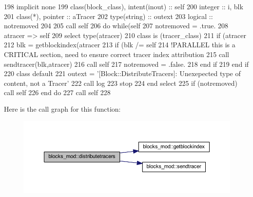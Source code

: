 \begin{DoxyCode}
198     \textcolor{keywordtype}{implicit none}
199     \textcolor{keywordtype}{class}(block\_class), \textcolor{keywordtype}{intent(inout)} :: self
200     \textcolor{keywordtype}{integer} :: i, blk
201     \textcolor{keywordtype}{class}(*), \textcolor{keywordtype}{pointer} :: aTracer
202     \textcolor{keywordtype}{type}(string) :: outext
203     \textcolor{keywordtype}{logical} :: notremoved
204 
205     \textcolor{keyword}{call }self%
206     \textcolor{keywordflow}{do} \textcolor{keywordflow}{while}(self%
207         notremoved = .true.
208         atracer => self%
209         \textcolor{keywordflow}{select type}(atracer)
210 \textcolor{keywordflow}{        class is} (tracer\_class)
211             \textcolor{keywordflow}{if} (atracer%
212                 blk = getblockindex(atracer%
213                 \textcolor{keywordflow}{if} (blk /= self%
214                     \textcolor{comment}{!PARALLEL this is a CRITICAL section, need to ensure correct tracer index attribution}
215                     \textcolor{keyword}{call }sendtracer(blk,atracer)
216                     \textcolor{keyword}{call }self%
217                     notremoved = .false.
218 \textcolor{keywordflow}{                end if}
219 \textcolor{keywordflow}{            end if}
220 \textcolor{keywordflow}{            class default}
221             outext = \textcolor{stringliteral}{'[Block::DistributeTracers]: Unexepected type of content, not a Tracer'}
222             \textcolor{keyword}{call }log%
223             stop
224 \textcolor{keywordflow}{        end select}
225         \textcolor{keywordflow}{if} (notremoved) \textcolor{keyword}{call }self%
226 \textcolor{keywordflow}{    end do}
227     \textcolor{keyword}{call }self%
228 
\end{DoxyCode}
Here is the call graph for this function\+:\nopagebreak
\begin{figure}[H]
\begin{center}
\leavevmode
\includegraphics[width=350pt]{namespaceblocks__mod_aa178415bcc40cf169744d356e1a09c6b_cgraph}
\end{center}
\end{figure}

